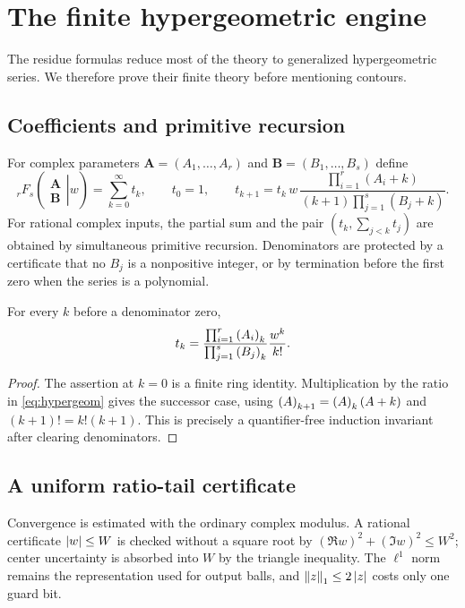 \section{The finite hypergeometric engine}\label{sec:hypergeom}

The residue formulas reduce most of the theory to generalized hypergeometric
series.  We therefore prove their finite theory before mentioning contours.

\subsection{Coefficients and primitive recursion}

For complex parameters $\mathbf A=(A_1,\ldots,A_r)$ and
$\mathbf B=(B_1,\ldots,B_s)$ define
\begin{equation}\label{eq:hypergeom}
 {}_rF_s\!\left(\left.\begin{matrix}\mathbf A\\\mathbf B\end{matrix}\right|w\right)
 =\sum_{k=0}^{\infty}t_k,
 \qquad
 t_0=1,
 \qquad
 t_{k+1}=t_k\,w\,
 \frac{\prod_{i=1}^{r}(A_i+k)}{(k+1)\prod_{j=1}^{s}(B_j+k)}.
\end{equation}
For rational complex inputs, the partial sum and the pair
$(t_k,\sum_{j<k}t_j)$ are obtained by simultaneous primitive recursion.
Denominators are protected by a certificate that no $B_j$ is a nonpositive
integer, or by termination before the first zero when the series is a
polynomial.

\begin{lemma}\label{lem:rising}
For every $k$ before a denominator zero,
\[
 t_k=\frac{\prod_{i=1}^{r}\left(A_i\right)_{k}}
           {\prod_{j=1}^{s}\left(B_j\right)_{k}}\frac{w^k}{k!}.
\]
\end{lemma}
\begin{proof}
The assertion at $k=0$ is a finite ring identity.  Multiplication by the ratio
in \eqref{eq:hypergeom} gives the successor case, using
$\left(A\right)_{k+1}=\left(A\right)_{k}(A+k)$ and $(k+1)!=k!(k+1)$.  This is precisely a
quantifier-free induction invariant after clearing denominators.
\end{proof}

\subsection{A uniform ratio-tail certificate}

Convergence is estimated with the ordinary complex modulus.  A rational
certificate $\left|w\right|\le W$ is checked without a square root by
$(\Re w)^2+(\Im w)^2\le W^2$; center uncertainty is absorbed into $W$ by the
triangle inequality.  The $\ell^1$ norm remains the representation used for
output balls, and $\left\lVert z\right\rVert_1\le2\left|z\right|$ costs only one guard bit.

